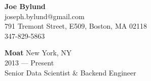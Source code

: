 
\begin{center}
\myfontsize{\bigheader}
\textbf{Joe Bylund}\\
\myfontsize{\bodysize}
joseph.bylund@gmail.com\\
791 Tremont Street, E509, Boston, MA 02118\\
347-829-5863\hspace{3ex}\\
\end{center}

\hrulefill
\vspace{\littleskip}



\myfontsize{\bigheader}
\textbf{Moat}
\myfontsize{\bodysize}
New York, NY\\
2013 --- Present\\
Senior Data Scientist \& Backend Engineer\\

